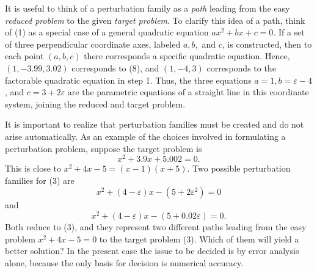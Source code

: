 \documentclass{article}
\theoremstyle{definition}
\theoremstyle{remark}
\theoremstyle{definition}
\begin{document}
    It is useful to think of a perturbation family as a \textit{path} leading from the easy \textit{reduced problem} to the given \textit{target problem}. To clarify this idea of a path, think of (1) as a special case of a general quadratic equation $ax^2+bx+c=0$. If a set of three perpendicular coordinate axes, labeled $a,b,$ and $c$, is constructed, then to each point $(a,b,c)$ there corresponds a specific quadratic equation. Hence, $(1,-3.99,3.02)$ corresponds to (8), and $(1,-4,3)$ corresponds to the factorable quadratic equation in step 1. Thus, the three equations $a=1, b=\varepsilon-4$, and $c=3+2\varepsilon$ are the parametric equations of a straight line in this coordinate system, joining the reduced and target problem.\par
    It is important to realize that perturbation families must be created and do not arise automatically. As an example of the choices involved in formulating a perturbation problem, suppose the target problem is 
        \begin{equation}
            x^2+3.9x+5.002=0.
        \end{equation}
    \noindent This is close to $x^2+4x-5=(x-1)(x+5)$. Two possible perturbation families for (3) are 
        \begin{equation}
            x^2+(4-\varepsilon)x-(5+2\varepsilon^2)=0
        \end{equation}
    \noindent and 
        \begin{equation}
            x^2+(4-\varepsilon)x-(5+0.02\varepsilon)=0.
        \end{equation}
    \noindent Both reduce to (3), and they represent two different paths leading from the easy problem $x^2+4x-5=0$ to the target problem (3). Which of them will yield a better solution? In the present case the issue to be decided is by error analysis alone, because the only basis for decision is numerical accuracy. 
\end{document}
